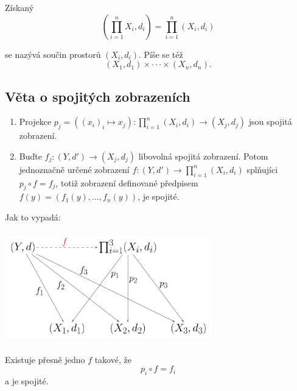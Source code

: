 \documentclass[../main.tex]{subfiles}
\begin{document}
Získaný
\[\left(\prod^n_{i=1}X_i,d_i\right) = \prod^n_{i=1}(X_i,d_i)\]

se nazývá součin prostorů $(X_i, d_i)$. Píše se též 
\[(X_1,d_1) \times \cdot \cdot \cdot \times (X_n,d_n).\]
\noindent

\subsection{Věta o spojitých zobrazeních}
\begin{enumerate}
\item Projekce $p_j = ((x_i)_i \mapsto x_j) : \prod^n_{i=1}(X_i,d_i) \rightarrow (X_j,d_j)$ jsou spojitá zobrazení.

\item Buďte $f_j:(Y,d') \rightarrow (X_j,d_j)$ libovolná spojitá zobrazení. Potom jednoznačně určené zobrazení 
$f:(Y,d') \rightarrow \prod^n_{i=1}(X_i,d_i)$ splňujíci $p_j \circ f = f_j$, totiž zobrazení definované předpisem
$f(y) = (f_1(y),...,f_n(y))$, je spojité.
\end{enumerate}

Jak to vypadá:
\begin{center}
\includegraphics[width=9cm,height=4.8cm]{ipkm.png}
\end{center}
Existuje přesně jedno $f$ takové, že 
\[p_i \circ f = f_i\]
a je spojité.
\end{document}
